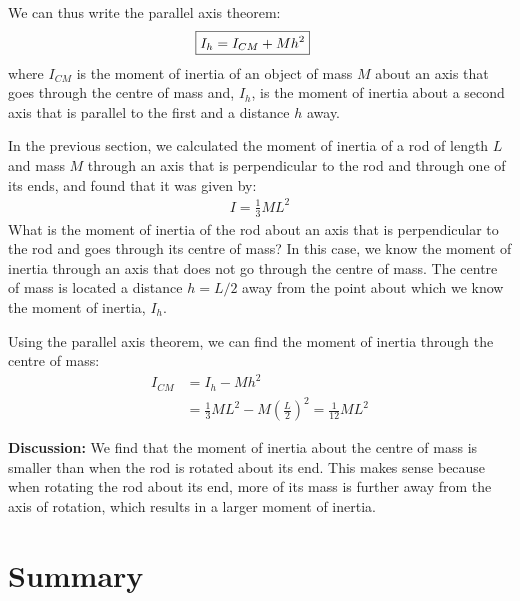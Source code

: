 We can thus write the parallel axis theorem:
\begin{align}
\Aboxed{I_h = I_{CM} + Mh^2}
\end{align}
where $I_{CM}$ is the moment of inertia of an object of mass $M$ about an axis that goes through the centre of mass and, $I_h$, is the moment of inertia about a second axis that is parallel to the first and a distance $h$ away.

\begin{example}{In the previous section, we calculated the moment of inertia of a rod of length $L$ and mass $M$ through an axis that is perpendicular to the rod and through one of its ends, and found that it was given by:
\begin{align*}
I=\frac{1}{3}ML^2
\end{align*}
What is the moment of inertia of the rod about an axis that is perpendicular to the rod and goes through its centre of mass?}
In this case, we know the moment of inertia through an axis that does not go through the centre of mass. The centre of mass is located a distance $h=L/2$ away from the point about which we know the moment of inertia, $I_h$. 

Using the parallel axis theorem, we can find the moment of inertia through the centre of mass:
\begin{align*}
I_{CM} &= I_h - Mh^2\\
&=\frac{1}{3}ML^2 - M \left( \frac{L}{2}\right)^2 = \frac{1}{12}ML^2
\end{align*}

\textbf{Discussion: }We find that the moment of inertia about the centre of mass is smaller than when the rod is rotated about its end. This makes sense because when rotating the rod about its end, more of its mass is further away from the axis of rotation, which results in a larger moment of inertia.
\end{example}




\newpage
\section{Summary}

